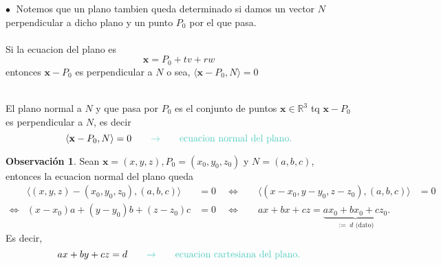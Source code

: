\documentclass{article}
\theoremstyle{definition}
\theoremstyle{definition}
\newtheorem*{obs}{Observación}
\theoremstyle{remark}
\newcommand\bl{$\bullet\;$}
\begin{document}
\begin{figure}[h]
\centering
\def\svgwidth{0.75\textwidth}

\end{figure}
\;
\pagebreak \textcolor{rojop2}{\bl} Notemos que un plano tambien queda determinado si damos un vector $N$ perpendicular a dicho plano y un punto $P_0$ por el que pasa. \\\\ Si la ecuacion del plano es \[
  \mathbf{x}=P_0+tv+rw
\] entonces $\mathbf{x}-P_0$ es perpendicular a $N$ o sea, $\langle \mathbf{x}-P_0 , N \rangle = 0$

\begin{figure}[h]
\centering
\def\svgwidth{0.75\textwidth}

\end{figure} 
\begin{defi}
  \; \\
  El plano normal a $N$ y que pasa por $P_0$ es el conjunto de puntos $\mathbf{x} \in \mathbb{R}^3$ tq $\mathbf{x}-P_0$ es perpendicular a $N$, es decir \[
    \langle \mathbf{x} - P_0, N\rangle = 0  \quad \quad \textcolor{verdep2}{\to} \quad \quad \text{\textcolor{verdep2}{ecuacion normal del plano.}}
  \]
\end{defi}
\begin{obs}
  Sean $\mathbf{x}=(x,y,z), P_0=(x_0,y_0,z_0)$ y $N=(a,b,c)$, entonces la ecuacion normal del plano queda \[
    \begin{array}{lllll}
  & \langle (x,y,z) - (x_0,y_0,z_0), (a,b,c) \rangle  & = 0 \quad \Leftrightarrow \quad & \langle (x-x_0,y-y_0,z-z_0), (a,b,c) \rangle &  = 0  \\
      \Leftrightarrow & (x-x_0)a+(y-y_0)b+(z-z_0)c & = 0  \quad \Leftrightarrow \quad & ax+bx+cz=\underbrace{ax_0+bx_0+cz_0}_{:= \;  d \text{ (dato)}} .
\end{array}\]
Es decir, \[ 
  ax+by+cz = d \quad \quad \textcolor{verdep2}{\to} \quad \quad \text{\textcolor{verdep2}{ecuacion cartesiana del plano.}}
\]
\end{obs}
\end{document}
